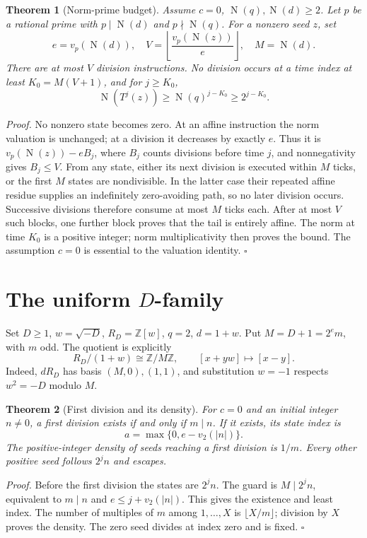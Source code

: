 \documentclass[11pt,letterpaper]{article}
\newcommand{\Z}{\mathbb{Z}}
\newtheorem{theorem}{Theorem}
\newenvironment{proof}{\noindent\textit{Proof.}}{\hfill\(\square\)}
\newcommand{\OrderNorm}{\operatorname{N}}
\newcommand{\RawMap}{T}
\begin{document}
\begin{theorem}[Norm-prime budget]
Assume \(c=0\), \(\OrderNorm(q),\OrderNorm(d)\ge2\). Let \(p\) be a rational
prime with \(p\mid\OrderNorm(d)\) and \(p\nmid\OrderNorm(q)\).
For a nonzero seed \(z\), set
\[
e=v_p(\OrderNorm(d)),\quad
V=\left\lfloor\frac{v_p(\OrderNorm(z))}{e}\right\rfloor,\quad
M=\OrderNorm(d).
\]
There are at most \(V\) division instructions. No division occurs at
a time index at least \(K_0=M(V+1)\), and for \(j\ge K_0\),
\[
\OrderNorm(\RawMap^j(z))\ge\OrderNorm(q)^{j-K_0}\ge2^{j-K_0}.
\]
\end{theorem}
\begin{proof}
No nonzero state becomes zero. At an affine instruction the norm
valuation is unchanged; at a division it decreases by exactly \(e\).
Thus it is \(v_p(\OrderNorm(z))-eB_j\), where \(B_j\) counts divisions
before time \(j\), and nonnegativity gives \(B_j\le V\).
From any state, either its next division is executed within \(M\)
ticks, or the first \(M\) states are nondivisible. In the latter case
their repeated affine residue supplies an indefinitely zero-avoiding
path, so no later division occurs. Successive divisions therefore
consume at most \(M\) ticks each. After at most \(V\) such blocks,
one further block proves that the tail is entirely affine.
The norm at time \(K_0\) is a positive integer; norm multiplicativity
then proves the bound. The assumption \(c=0\) is essential to the
valuation identity.
\end{proof}

\section{\texorpdfstring{The uniform \(D\)-family}{The uniform D-family}}

Set \(D\ge1\), \(w=\sqrt{-D}\), \(R_D=\Z[w]\),
\(q=2\), \(d=1+w\). Put \(M=D+1=2^e m\), with \(m\) odd.
The quotient is explicitly
\[
R_D/(1+w)\cong\Z/M\Z,\qquad [x+yw]\longmapsto[x-y].
\]
Indeed, \(dR_D\) has basis \((M,0),(1,1)\), and substitution \(w=-1\)
respects \(w^2=-D\) modulo \(M\).

\begin{theorem}[First division and its density]
For \(c=0\) and an initial integer \(n\ne0\), a first division exists
if and only if \(m\mid n\). If it exists, its state index is
\[
a=\max\{0,e-v_2(|n|)\}.
\]
The positive-integer density of seeds reaching a first division is
\(1/m\). Every other positive seed follows \(2^j n\) and escapes.
\end{theorem}
\begin{proof}
Before the first division the states are \(2^j n\).
The guard is \(M\mid2^j n\), equivalent to \(m\mid n\) and
\(e\le j+v_2(|n|)\). This gives the existence and least index.
The number of multiples of \(m\) among \(1,\ldots,X\) is
\(\lfloor X/m\rfloor\); division by \(X\) proves the density.
The zero seed divides at index zero and is fixed.
\end{proof}
\end{document}
